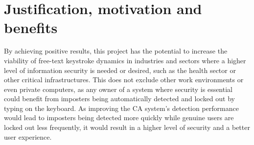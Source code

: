 \documentclass[informationsecurity]{gucmasterproject}
\begin{document}



%

\section{Justification, motivation and benefits}

By achieving positive results, this project has the potential to increase the viability of free-text keystroke dynamics in industries and sectors where a higher level of information security is needed or desired, such as the health sector or other critical infrastructures.
This does not exclude other work environments or even private computers, as any owner of a system where security is essential could benefit from imposters being automatically detected and locked out by typing on the keyboard.
As improving the CA system's detection performance would lead to imposters being detected more quickly while genuine users are locked out less frequently, it would result in a higher level of security and a better user experience.
\end{document}
